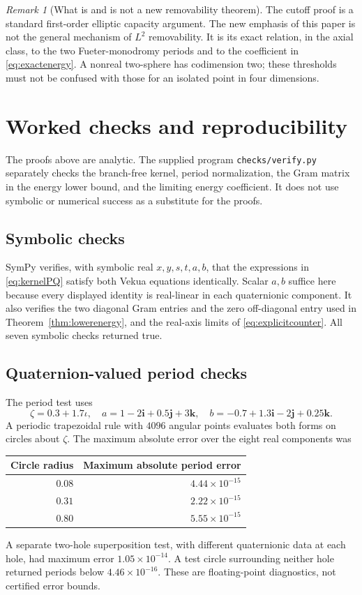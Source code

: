 \documentclass[11pt,a4paper]{article}
\numberwithin{equation}{section}
\theoremstyle{definition}
\theoremstyle{remark}
\newtheorem{remark}[theorem]{Remark}
\newcommand{\ii}{\mathbf i}
\newcommand{\jj}{\mathbf j}
\newcommand{\kk}{\mathbf k}
\begin{document}
\begin{remark}[What is and is not a new removability theorem]
The cutoff proof is a standard first-order elliptic capacity argument.
The new emphasis of this paper is not the general mechanism of $L^2$
removability. It is its exact relation, in the axial class, to the two
Fueter-monodromy periods and to the coefficient in
\eqref{eq:exactenergy}. A nonreal two-sphere has codimension two;
these thresholds must not be confused with those for an isolated point
in four dimensions.
\end{remark}

\section{Worked checks and reproducibility}
\label{sec:checks}
The proofs above are analytic. The supplied program
\texttt{checks/verify.py} separately checks the branch-free kernel,
period normalization, the Gram matrix in the energy lower bound, and
the limiting energy coefficient. It does not use symbolic or numerical
success as a substitute for the proofs.

\subsection{Symbolic checks}
SymPy verifies, with symbolic real $x,y,s,t,a,b$, that the expressions
in \eqref{eq:kernelPQ} satisfy both Vekua equations identically. Scalar
$a,b$ suffice here because every displayed identity is real-linear in
each quaternionic component. It also verifies the two diagonal Gram
entries and the zero off-diagonal entry used in
Theorem~\ref{thm:lowerenergy}, and the real-axis limits of
\eqref{eq:explicitcounter}. All seven symbolic checks returned true.

\subsection{Quaternion-valued period checks}
The period test uses
\[
 \zeta=0.3+1.7\iota,\quad
 a=1-2\ii+0.5\jj+3\kk,\quad
 b=-0.7+1.3\ii-2\jj+0.25\kk.
\]
A periodic trapezoidal rule with $4096$ angular points evaluates both
forms on circles about $\zeta$. The maximum absolute error over the
eight real components was
\begin{center}
\begin{tabular}{@{}rr@{}}
\toprule
Circle radius & Maximum absolute period error\\
\midrule
$0.08$ & $4.44\times10^{-15}$\\
$0.31$ & $2.22\times10^{-15}$\\
$0.80$ & $5.55\times10^{-15}$\\
\bottomrule
\end{tabular}
\end{center}
A separate two-hole superposition test, with different quaternionic data
at each hole, had maximum error $1.05\times10^{-14}$. A test circle
surrounding neither hole returned periods below $4.46\times10^{-16}$.
These are floating-point diagnostics, not certified error bounds.
\end{document}
